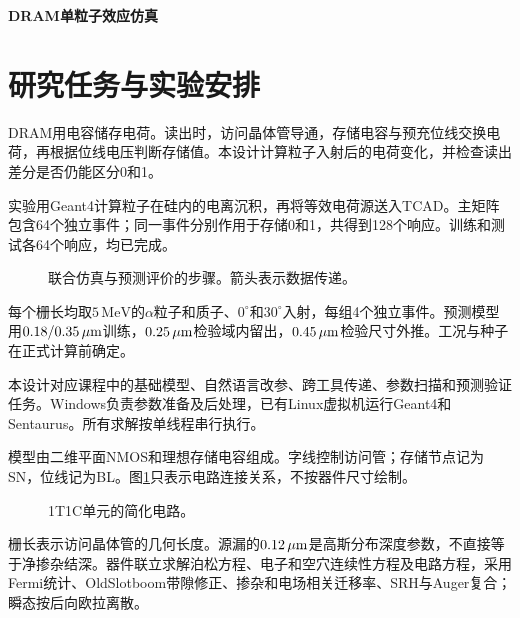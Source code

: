 \documentclass[UTF8,a4paper,zihao=-4,fontset=fandol]{ctexart}
\begin{document}
\begin{titlepage}
\centering\vspace*{5.4cm}
{\fontsize{28}{40}\selectfont\bfseries\color{ink}DRAM单粒子效应仿真\par}
\vspace{.7cm}{\LARGE 课程设计报告\par}
\vspace{3.2cm}{\large 指导教师：李洋\par}
\vspace{.65cm}{\large 2026年10月11日\par}
\end{titlepage}

\section{研究任务与实验安排}
DRAM用电容储存电荷。读出时，访问晶体管导通，存储电容与预充位线交换电荷，再根据位线电压判断存储值\cite{keeth2001}。本设计计算粒子入射后的电荷变化，并检查读出差分是否仍能区分0和1。

实验用Geant4计算粒子在硅内的电离沉积，再将等效电荷源送入TCAD。主矩阵包含64个独立事件；同一事件分别作用于存储0和1，共得到128个响应。训练和测试各64个响应，均已完成。

\begin{figure}[H]\centering\workflowdiagram\caption{联合仿真与预测评价的步骤。箭头表示数据传递。}\end{figure}

每个栅长均取$5\,\mathrm{MeV}$的$\alpha$粒子和质子、$0^\circ$和$30^\circ$入射，每组4个独立事件。预测模型用$0.18/0.35\,\mu\mathrm{m}$训练，$0.25\,\mu\mathrm{m}$检验域内留出，$0.45\,\mu\mathrm{m}$检验尺寸外推。工况与种子在正式计算前确定。


本设计对应课程中的基础模型、自然语言改参、跨工具传递、参数扫描和预测验证任务\cite{course}。Windows负责参数准备及后处理，已有Linux虚拟机运行Geant4和Sentaurus。所有求解按单线程串行执行。

模型由二维平面NMOS和理想存储电容组成。字线控制访问管；存储节点记为SN，位线记为BL。图\ref{cr:model}只表示电路连接关系，不按器件尺寸绘制。
\begin{figure}[H]\centering\modeldiagram\caption{1T1C单元的简化电路。}\label{cr:model}\end{figure}
\begin{table}[H]\centering\small\caption{主要模型参数。具体取值为本项目的探索设定。}\paramtable\end{table}
栅长表示访问晶体管的几何长度。源漏的$0.12\,\mu\mathrm{m}$是高斯分布深度参数，不直接等于净掺杂结深。器件联立求解泊松方程、电子和空穴连续性方程及电路方程，采用Fermi统计、OldSlotboom带隙修正、掺杂和电场相关迁移率、SRH与Auger复合；瞬态按后向欧拉离散。
\begin{table}[H]\centering\small\caption{统一的入射、保持和读出时序。}\timingtable\end{table}
\end{document}

